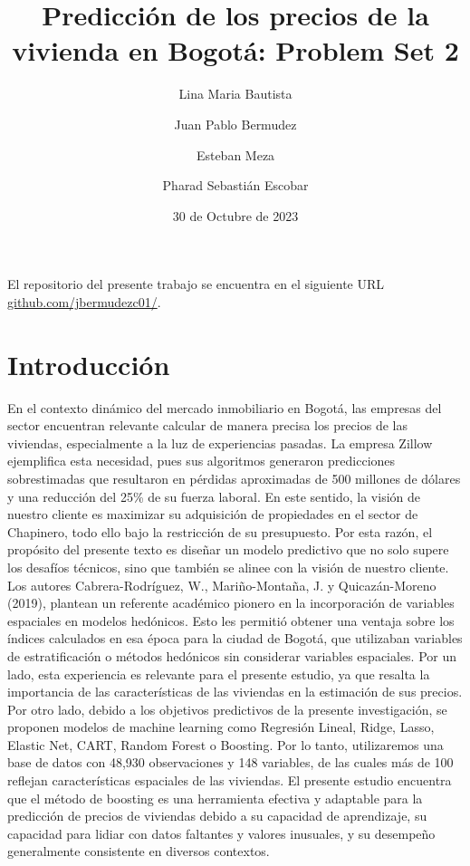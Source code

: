 \documentclass[12pt]{article}
\title{\textbf{Predicción de los precios de la vivienda en Bogotá: Problem Set 2}}
\author{Lina Maria Bautista}
\author{Juan Pablo Bermudez}
\author{Esteban Meza}
\author{Pharad Sebastián Escobar}
\affil{}
\date{30 de Octubre de 2023}
\begin{document}
\maketitle
El repositorio del presente trabajo se encuentra en el siguiente URL \href{https://github.com/jbermudezc01/Problem_set2_BDML}{github.com/jbermudezc01/}.
\section{Introducción}
En el contexto dinámico del mercado inmobiliario en Bogotá, las empresas del sector encuentran relevante calcular de manera precisa los precios de las viviendas, especialmente a la luz de experiencias pasadas. La empresa Zillow ejemplifica esta necesidad, pues sus algoritmos generaron predicciones sobrestimadas que resultaron en pérdidas aproximadas de 500 millones de dólares y una reducción del 25\% de su fuerza laboral. En este sentido, la visión de nuestro cliente es maximizar su adquisición de propiedades en el sector de Chapinero, todo ello bajo la restricción de su presupuesto. Por esta razón, el propósito del presente texto es diseñar un modelo predictivo que no solo supere los desafíos técnicos, sino que también se alinee con la visión de nuestro cliente.\\

Los autores Cabrera-Rodríguez, W., Mariño-Montaña, J. y Quicazán-Moreno (2019), plantean un referente académico pionero en la incorporación de variables espaciales en modelos hedónicos. Esto les permitió obtener una ventaja sobre los índices calculados en esa época para la ciudad de Bogotá, que utilizaban variables de estratificación o métodos hedónicos sin considerar variables espaciales. Por un lado, esta experiencia es relevante para el presente estudio, ya que resalta la importancia de las características de las viviendas en la estimación de sus precios. Por otro lado, debido a los objetivos predictivos de la presente investigación, se proponen modelos de machine learning como Regresión Lineal, Ridge, Lasso, Elastic Net,
CART, Random Forest o Boosting. Por lo tanto, utilizaremos una base de datos con 48,930 observaciones y 148 variables, de las cuales más de 100 reflejan características espaciales de las viviendas. El presente estudio encuentra que el método de boosting es una herramienta efectiva y adaptable para la predicción de precios de viviendas debido a su capacidad de aprendizaje, su capacidad para lidiar con datos faltantes y valores inusuales, y su desempeño generalmente consistente en diversos contextos.\\
\end{document}
